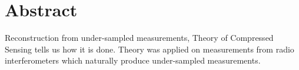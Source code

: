 \section*{Abstract}
Reconstruction from under-sampled measurements, Theory of Compressed Sensing tells us how it is done. Theory was applied on measurements from radio interferometers which naturally produce under-sampled measurements. 